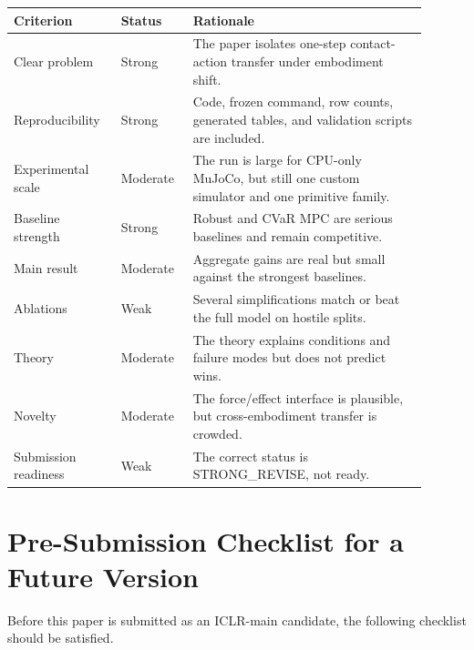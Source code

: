 \documentclass{article}
\begin{document}
\begin{center}
\begin{tabular}{p{0.22\linewidth}p{0.16\linewidth}p{0.52\linewidth}}
\toprule
Criterion & Status & Rationale \\
\midrule
Clear problem & Strong & The paper isolates one-step contact-action transfer under embodiment shift. \\
Reproducibility & Strong & Code, frozen command, row counts, generated tables, and validation scripts are included. \\
Experimental scale & Moderate & The run is large for CPU-only MuJoCo, but still one custom simulator and one primitive family. \\
Baseline strength & Strong & Robust and CVaR MPC are serious baselines and remain competitive. \\
Main result & Moderate & Aggregate gains are real but small against the strongest baselines. \\
Ablations & Weak & Several simplifications match or beat the full model on hostile splits. \\
Theory & Moderate & The theory explains conditions and failure modes but does not predict wins. \\
Novelty & Moderate & The force/effect interface is plausible, but cross-embodiment transfer is crowded. \\
Submission readiness & Weak & The correct status is STRONG\_REVISE, not ready. \\
\bottomrule
\end{tabular}
\end{center}

\section{Pre-Submission Checklist for a Future Version}

Before this paper is submitted as an ICLR-main candidate, the following checklist should be satisfied.
\end{document}
